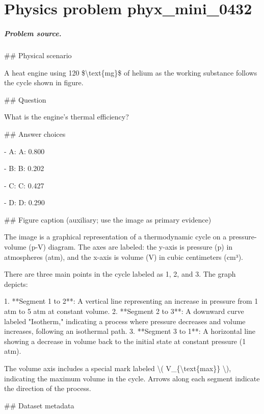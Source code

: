 
\chapter{Physics problem phyx\_mini\_0432}
\label{ch:PhyXMiniProblems_problem_phyx_mini_0432}

\paragraph{Problem source.}
\#\# Physical scenario

A heat engine using 120 \$\textbackslash{}text\{mg\}\$ of helium as the working substance follows the cycle shown in figure.

\#\# Question

What is the engine's thermal efficiency?

\#\# Answer choices

- A: A: 0.800

- B: B: 0.202

- C: C: 0.427

- D: D: 0.290

\#\# Figure caption (auxiliary; use the image as primary evidence)

The image is a graphical representation of a thermodynamic cycle on a pressure-volume (p-V) diagram. The axes are labeled: the y-axis is pressure (p) in atmospheres (atm), and the x-axis is volume (V) in cubic centimeters (cm³). 

There are three main points in the cycle labeled as 1, 2, and 3. The graph depicts:

1. **Segment 1 to 2**: A vertical line representing an increase in pressure from 1 atm to 5 atm at constant volume.
2. **Segment 2 to 3**: A downward curve labeled "Isotherm," indicating a process where pressure decreases and volume increases, following an isothermal path.
3. **Segment 3 to 1**: A horizontal line showing a decrease in volume back to the initial state at constant pressure (1 atm).

The volume axis includes a special mark labeled \textbackslash{}( V\_\{\textbackslash{}text\{max\}\} \textbackslash{}), indicating the maximum volume in the cycle. Arrows along each segment indicate the direction of the process.

\#\# Dataset metadata

